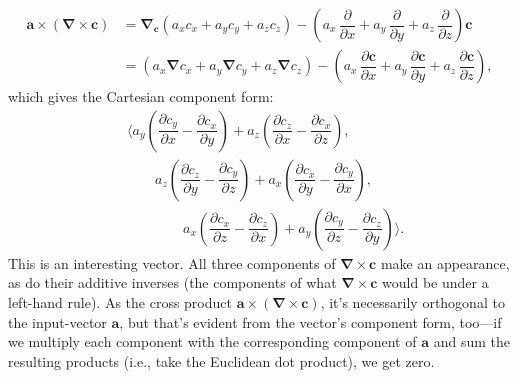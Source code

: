 \documentclass[12pt]{article}
\renewcommand{\vv}[1]{\mathbf{#1}}
\newcommand{\del}{\boldsymbol{\nabla}}
\begin{document}
\begin{equation*}
\begin{split}
\vv a \times (\del \times \vv c) &= \del_{\vv c} \left( a_x c_x + a_y c_y + a_z c_z \right) - \left( a_x \, \dfrac{\partial}{\partial x} + a_y \, \dfrac{\partial}{\partial y} + a_z \, \dfrac{\partial}{\partial z} \right) \vv c \\[3pt]
&= \left( a_x \del c_x + a_y \del c_y + a_z \del c_z \right) - \left( a_x \, \dfrac{\partial \vv c}{\partial x} + a_y \, \dfrac{\partial \vv c}{\partial y} + a_z \, \dfrac{\partial \vv c}{\partial z} \right) ,
\end{split}
\end{equation*}
which gives the Cartesian component form:
\begin{equation*}
\begin{split}
& \Bigg \langle a_y \left( \dfrac{\partial c_y}{\partial x} - \dfrac{\partial c_x}{\partial y} \right) + a_z \left( \dfrac{\partial c_z}{\partial x} - \dfrac{\partial c_x}{\partial z} \right) , \\
&\qquad  a_z \left( \dfrac{\partial c_z}{\partial y} - \dfrac{\partial c_y}{\partial z} \right) + a_x \left( \dfrac{\partial c_x}{\partial y} - \dfrac{\partial c_y}{\partial x} \right) , \\
&\qquad \qquad  a_x \left( \dfrac{\partial c_x}{\partial z} - \dfrac{\partial c_z}{\partial x} \right) + a_y \left( \dfrac{\partial c_y}{\partial z} - \dfrac{\partial c_z}{\partial y} \right) \Bigg \rangle .
\end{split}
\end{equation*}
This is an interesting vector. All three components of $\del \times \vv c$ make an appearance, as do their additive inverses (the components of what $\del \times \vv c$ would be under a left-hand rule). As the cross product $\vv a \times (\del \times \vv c)$, it's necessarily orthogonal to the input-vector $\vv a$, but that's evident from the vector's component form, too---if we multiply each component with the corresponding component of $\vv a$ and sum the resulting products (i.e., take the Euclidean dot product), we get zero.
\end{document}
